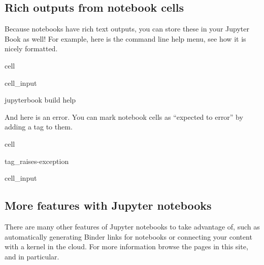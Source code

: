 \documentclass[letterpaper,10pt,english]{jupyterBook}
\begin{document}
\subsection{Rich outputs from notebook cells}
\label{\detokenize{content/1_modeling/notebooks:rich-outputs-from-notebook-cells}}
\sphinxAtStartPar
Because notebooks have rich text outputs, you can store these in
your Jupyter Book as well! For example, here is the command line help
menu, see how it is nicely formatted.

\begin{sphinxuseclass}{cell}\begin{sphinxVerbatimInput}

\begin{sphinxuseclass}{cell_input}
\begin{sphinxVerbatim}[commandchars=\\\{\}]
jupyter\PYGZhy{}book build \PYGZhy{}\PYGZhy{}help
\end{sphinxVerbatim}

\end{sphinxuseclass}\end{sphinxVerbatimInput}

\end{sphinxuseclass}
\sphinxAtStartPar
And here is an error. You can mark notebook cells as “expected to error” by adding a
 tag to them.

\begin{sphinxuseclass}{cell}
\begin{sphinxuseclass}{tag_raises-exception}\begin{sphinxVerbatimInput}

\begin{sphinxuseclass}{cell_input}
\begin{sphinxVerbatim}[commandchars=\\\{\}]
\end{sphinxVerbatim}

\end{sphinxuseclass}\end{sphinxVerbatimInput}

\end{sphinxuseclass}
\end{sphinxuseclass}

\subsection{More features with Jupyter notebooks}
\label{\detokenize{content/1_modeling/notebooks:more-features-with-jupyter-notebooks}}
\sphinxAtStartPar
There are many other features of Jupyter notebooks to take advantage of,
such as automatically generating Binder links for notebooks or connecting your content with a kernel in the cloud.
For more information browse the pages in this site, and  in particular.
\end{document}
